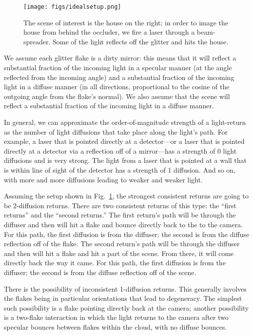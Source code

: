 \documentclass[11pt]{article}
\begin{document}
\begin{figure}
\begin{center}
\texttt{[image: figs/idealsetup.png]} 
\caption{The scene of interest is the house on the right; in order to image the house from behind the occluder, we fire a laser through a beam-spreader. Some of the light reflects off the glitter and hits the house. \label{fig:idealsetup}}
\end{center}
\end{figure}

We assume each glitter flake is a dirty mirror: this means that it will reflect a substantial fraction of the incoming light in a specular manner (at the angle reflected from the incoming angle) and a substantial fraction of the incoming light in a diffuse manner (in all directions, proportional to the cosine of the outgoing angle from the flake's normal). We also assume that the scene will reflect a substantial fraction of the incoming light in a diffuse manner.

In general, we can approximate the order-of-magnitude strength of a light-return as the number of light diffusions that take place along the light's path. For example, a laser that is pointed directly at a detector---or a laser that is pointed directly at a detector via a reflection off of a mirror---has a strength of 0 light diffusions and is very strong. The light from a laser that is pointed at a wall that is within line of sight of the detector has a strength of 1 diffusion. And so on, with more and more diffusions leading to weaker and weaker light.

Assuming the setup shown in Fig.~\ref{fig:idealsetup}, the strongest consistent returns are going to be 2-diffusion returns. There are two consistent returns of this type: the ``first returns'' and the ``second returns.'' The first return's path will be through the diffuser and then will hit a flake and bounce directly back to the to the camera. For this path, the first diffusion is from the diffuser; the second is from the diffuse reflection off of the flake. The second return's path will be through the diffuser and then will hit a flake and hit a part of the scene. From there, it will come directly back the way it came. For this path, the first diffusion is from the diffuser; the second is from the diffuse reflection off of the scene.

There is the possibility of inconsistent 1-diffusion returns. This generally involves the flakes being in particular orientations that lead to degeneracy. The simplest such possibility is a flake pointing directly back at the camera; another possibility is a two-flake interaction in which the light returns to the camera after two specular bounces between flakes within the cloud, with no diffuse bounces.
\end{document}
